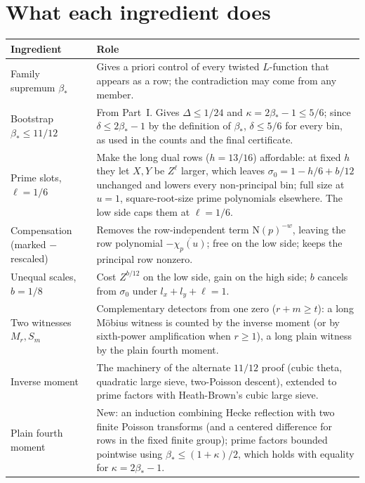 \documentclass[11pt]{article}
\newcommand{\N}{\mathrm N}
\begin{document}
\section{What each ingredient does}\label{sec:summary}
\begin{center}
\begin{tabular}{p{4.2cm}p{10.3cm}}
\toprule
Ingredient & Role\\\midrule
Family supremum $\beta_*$ & Gives a priori control of every twisted $L$-function that appears as a row; the contradiction may come from any member.\\
Bootstrap $\beta_*\le11/12$ & From Part~I. Gives $\Delta\le1/24$ and $\kappa=2\beta_*-1\le5/6$; since $\delta\le2\beta_*-1$ by the definition of $\beta_*$, $\delta\le5/6$ for every bin, as used in the counts and the final certificate.\\
Prime slots, $\ell=1/6$ & Make the long dual rows ($h=13/16$) affordable: at fixed $h$ they let $X,Y$ be $Z^\ell$ larger, which leaves $\sigma_0=1-h/6+b/12$ unchanged and lowers every non-principal bin; full size at $u=1$, square-root-size prime polynomials elsewhere. The low side caps them at $\ell=1/6$.\\
Compensation (marked $-$ rescaled) & Removes the row-independent term $\N(p)^{-w}$, leaving the row polynomial $-\overline{\chi_p(u)}$; free on the low side; keeps the principal row nonzero.\\
Unequal scales, $b=1/8$ & Cost $Z^{b/12}$ on the low side, gain on the high side; $b$ cancels from $\sigma_0$ under $l_x+l_y+\ell=1$.\\
Two witnesses $M_r,S_m$ & Complementary detectors from one zero ($r+m\ge t$): a long M\"obius witness is counted by the inverse moment (or by sixth-power amplification when $r\ge1$), a long plain witness by the plain fourth moment.\\
Inverse moment & The machinery of the alternate $11/12$ proof \cite{OAI1112} (cubic theta, quadratic large sieve, two-Poisson descent), extended to prime factors with Heath-Brown's cubic large sieve.\\
Plain fourth moment & New: an induction combining Hecke reflection with two finite Poisson transforms (and a centered difference for rows in the fixed finite group); prime factors bounded pointwise using $\beta_*\le(1+\kappa)/2$, which holds with equality for $\kappa=2\beta_*-1$.\\
\bottomrule
\end{tabular}
\end{center}
\end{document}

